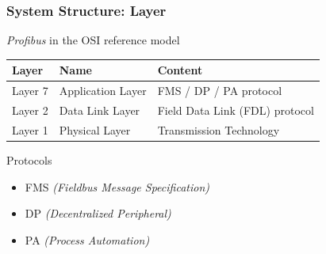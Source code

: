 \documentclass{beamer}
\begin{document}
\begin{frame}
  \frametitle{System Structure: Layer}
  \textit{Profibus} in the OSI reference model~\cite{profibusmanual}
  \begin{center}
    \footnotesize
    \begin{tabular}[h]{l|l|l}
      \textbf{Layer}  & \textbf{Name}     & \textbf{Content} \\
      \hline
      Layer 7         & Application Layer & FMS / DP / PA protocol \\
      Layer 2         & Data Link Layer   & Field Data Link (FDL) protocol \\
      Layer 1         & Physical Layer    & Transmission Technology
    \end{tabular}
    \normalsize
  \end{center}
  Protocols
  \begin{itemize}
    \item FMS \textit{(Fieldbus Message Specification)}
    \item DP \textit{(Decentralized Peripheral)}
    \item PA \textit{(Process Automation)}
  \end{itemize}
\end{frame}
\end{document}
